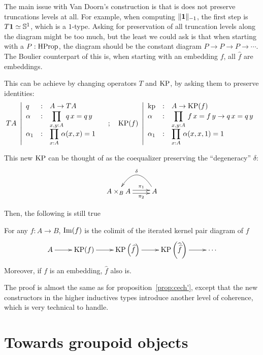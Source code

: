 The main issue with Van Doorn's construction is
that is does not preserve truncations levels at all. For example, when
computing $\|\mathbf{1}\|_{-1}$, the first step is $T\mathbf{1} \simeq \mathbb{S}^1$,
which is a $1$-type. 
Asking for preservation of all truncation levels along the diagram
might be too much, but the least we could ask is that when starting
with a $P:\operatorname{HProp}$, the diagram should be the constant diagram $P\to
P \to P\to \cdots$. The Boulier counterpart of this is, when starting
with an embedding $f$, all $\widehat f$ are embeddings. 

This can be achieve by changing operators $T$ and $\operatorname{KP}$, by asking
them to preserve identities:
\[
  TA~\left|
    \begin{array}{lll}
      q&:& A\to TA \\
      \alpha&:& \displaystyle{\prod_{x,y:A}\, q\, x = q\, y} \\
      \alpha_1&:& \displaystyle{\prod_{x:A}\, \alpha(x,x) = 1}
    \end{array}
  \right.
  \quad ; \quad
  \operatorname{KP}(f)~\left|
    \begin{array}{lll}
      \operatorname{kp}&:&A\to \operatorname{KP}(f) \\
      \alpha&:& \displaystyle{\prod_{x,y:A}\, f\, x = f\, y \to q\, x = q\, y} \\
      \alpha_1&:& \displaystyle{\prod_{x:A}\, \alpha(x,x,1) = 1}
    \end{array}    
  \right.
\]

This new $\operatorname{KP}$ can be thought of as the coequalizer preserving the
``degeneracy'' $\delta$:
\[ 
  \xymatrix{
    A\times_B A \ar@<-.5ex>[r]_-{\pi_2}
    \ar@<.5ex>[r]^-{\pi_1} & A \ar@/_2pc/[l]_\delta
  }
\]

Then, the following is still true

\begin{prop}\label{prop:cech}
  For any $f:A\to B$, $\operatorname{Im}(f)$ is the colimit of the iterated kernel
  pair diagram of $f$
\[\xymatrix{
  A \ar[r] & \KP(f) \ar[r] & \KP\left(\widehat f\right) \ar[r]& \KP\left(\widehat{\widehat f}\right) \ar[r]& \cdots
}\]
Moreover, if $f$ is an embedding, $\widehat f$ also is.
\end{prop}
The proof is almost the same as for proposition~\ref{prop:cech'},
except that the new constructors in the higher inductives types
introduce another level of coherence, which is very technical to handle.

\section{Towards groupoid objects}
\label{sec:groupoid}
